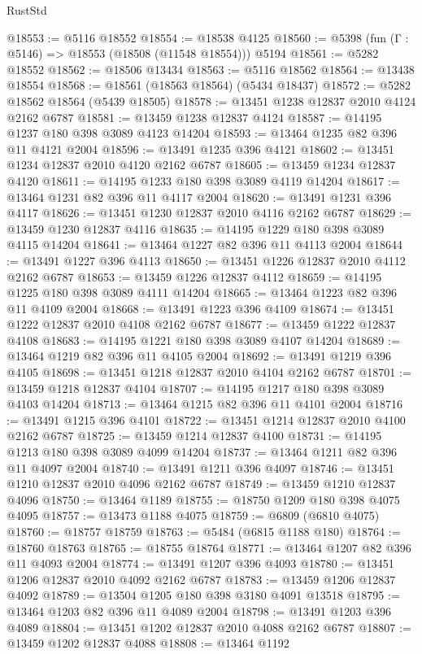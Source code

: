 \begin{lexlean}{RustStd}
\begin{coremodule}
@18553 := @5116 @18552
@18554 := @18538 @4125
@18560 := @5398 (fun (Γ : @5146) => @18553 (@18508 (@11548 @18554))) @5194
@18561 := @5282 @18552
@18562 := @18506 @13434
@18563 := @5116 @18562
@18564 := @13438 @18554
@18568 := @18561 (@18563 @18564) (@5434 @18437)
@18572 := @5282 @18562 @18564 (@5439 @18505)
@18578 := @13451 @1238 @12837 @2010 @4124 @2162 @6787
@18581 := @13459 @1238 @12837 @4124
@18587 := @14195 @1237 @180 @398 @3089 @4123 @14204
@18593 := @13464 @1235 @82 @396 @11 @4121 @2004
@18596 := @13491 @1235 @396 @4121
@18602 := @13451 @1234 @12837 @2010 @4120 @2162 @6787
@18605 := @13459 @1234 @12837 @4120
@18611 := @14195 @1233 @180 @398 @3089 @4119 @14204
@18617 := @13464 @1231 @82 @396 @11 @4117 @2004
@18620 := @13491 @1231 @396 @4117
@18626 := @13451 @1230 @12837 @2010 @4116 @2162 @6787
@18629 := @13459 @1230 @12837 @4116
@18635 := @14195 @1229 @180 @398 @3089 @4115 @14204
@18641 := @13464 @1227 @82 @396 @11 @4113 @2004
@18644 := @13491 @1227 @396 @4113
@18650 := @13451 @1226 @12837 @2010 @4112 @2162 @6787
@18653 := @13459 @1226 @12837 @4112
@18659 := @14195 @1225 @180 @398 @3089 @4111 @14204
@18665 := @13464 @1223 @82 @396 @11 @4109 @2004
@18668 := @13491 @1223 @396 @4109
@18674 := @13451 @1222 @12837 @2010 @4108 @2162 @6787
@18677 := @13459 @1222 @12837 @4108
@18683 := @14195 @1221 @180 @398 @3089 @4107 @14204
@18689 := @13464 @1219 @82 @396 @11 @4105 @2004
@18692 := @13491 @1219 @396 @4105
@18698 := @13451 @1218 @12837 @2010 @4104 @2162 @6787
@18701 := @13459 @1218 @12837 @4104
@18707 := @14195 @1217 @180 @398 @3089 @4103 @14204
@18713 := @13464 @1215 @82 @396 @11 @4101 @2004
@18716 := @13491 @1215 @396 @4101
@18722 := @13451 @1214 @12837 @2010 @4100 @2162 @6787
@18725 := @13459 @1214 @12837 @4100
@18731 := @14195 @1213 @180 @398 @3089 @4099 @14204
@18737 := @13464 @1211 @82 @396 @11 @4097 @2004
@18740 := @13491 @1211 @396 @4097
@18746 := @13451 @1210 @12837 @2010 @4096 @2162 @6787
@18749 := @13459 @1210 @12837 @4096
@18750 := @13464 @1189
@18755 := @18750 @1209 @180 @398 @4075 @4095
@18757 := @13473 @1188 @4075
@18759 := @6809 (@6810 @4075)
@18760 := @18757 @18759
@18763 := @5484 (@6815 @1188 @180)
@18764 := @18760 @18763
@18765 := @18755 @18764
@18771 := @13464 @1207 @82 @396 @11 @4093 @2004
@18774 := @13491 @1207 @396 @4093
@18780 := @13451 @1206 @12837 @2010 @4092 @2162 @6787
@18783 := @13459 @1206 @12837 @4092
@18789 := @13504 @1205 @180 @398 @3180 @4091 @13518
@18795 := @13464 @1203 @82 @396 @11 @4089 @2004
@18798 := @13491 @1203 @396 @4089
@18804 := @13451 @1202 @12837 @2010 @4088 @2162 @6787
@18807 := @13459 @1202 @12837 @4088
@18808 := @13464 @1192

\end{coremodule}
\end{lexlean}
